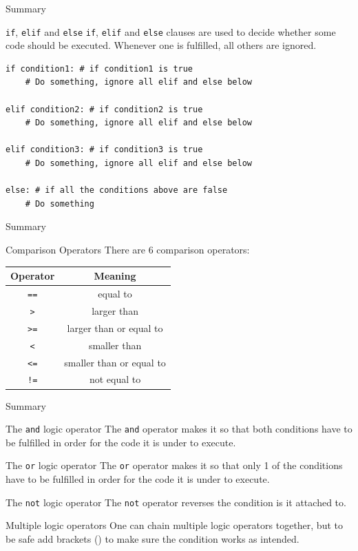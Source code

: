 \documentclass[dvipsnames, svgnames, x11names]{beamer}
\begin{document}
\begin{frame}[fragile]{Summary}
\begin{block}{\texttt{if}, \texttt{elif} and \texttt{else}}
\texttt{if}, \texttt{elif} and \texttt{else} clauses are used to decide whether some code should be executed.
Whenever one is fulfilled, all others are ignored.
\begin{verbatim}
if condition1: # if condition1 is true
    # Do something, ignore all elif and else below

elif condition2: # if condition2 is true
    # Do something, ignore all elif and else below

elif condition3: # if condition3 is true
    # Do something, ignore all elif and else below

else: # if all the conditions above are false
    # Do something
\end{verbatim}
\end{block}
\end{frame}

\begin{frame}[fragile]{Summary}
\begin{block}{Comparison Operators}
There are 6 comparison operators:
\begin{center}
\begin{tabular}{|c|c|}\hline
Operator & Meaning\\\hline
\texttt{==} & equal to\\\hline
\texttt{>} & larger than\\\hline
\texttt{>=} & larger than or equal to\\\hline
\texttt{<} & smaller than\\\hline
\texttt{<=} & smaller than or equal to\\\hline
\texttt{!=} & not equal to\\\hline
\end{tabular}
\end{center}
\end{block}
\end{frame}

\begin{frame}[fragile]{Summary}
\begin{block}{The \texttt{and} logic operator}
The \texttt{and} operator makes it so that both conditions have to be fulfilled in order for the code it is under to execute.
\end{block}
\begin{block}{The \texttt{or} logic operator}
The \texttt{or} operator makes it so that only 1 of the conditions have to be fulfilled in order for the code it is under to execute.
\end{block}
\begin{block}{The \texttt{not} logic operator}
The \texttt{not} operator reverses the condition is it attached to.
\end{block}
\begin{alertblock}{Multiple logic operators}
One can chain multiple logic operators together, but to be safe add brackets () to make sure the condition works as intended.
\end{alertblock}
\end{frame}
\end{document}
